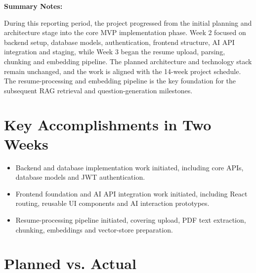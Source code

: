\documentclass[11pt,a4paper]{article}
\begin{document}
\vspace{8pt}
\textbf{Summary Notes:}

During this reporting period, the project progressed from the initial planning and architecture stage into the core MVP implementation phase. Week 2 focused on backend setup, database models, authentication, frontend structure, AI API integration and staging, while Week 3 began the resume upload, parsing, chunking and embedding pipeline. The planned architecture and technology stack remain unchanged, and the work is aligned with the 14-week project schedule. The resume-processing and embedding pipeline is the key foundation for the subsequent RAG retrieval and question-generation milestones.

\section{Key Accomplishments in Two Weeks}

\begin{itemize}
    \item Backend and database implementation work initiated, including core APIs, database models and JWT authentication.
    \item Frontend foundation and AI API integration work initiated, including React routing, reusable UI components and AI interaction prototypes.
    \item Resume-processing pipeline initiated, covering upload, PDF text extraction, chunking, embeddings and vector-store preparation.
\end{itemize}

\section{Planned vs. Actual}
\end{document}
